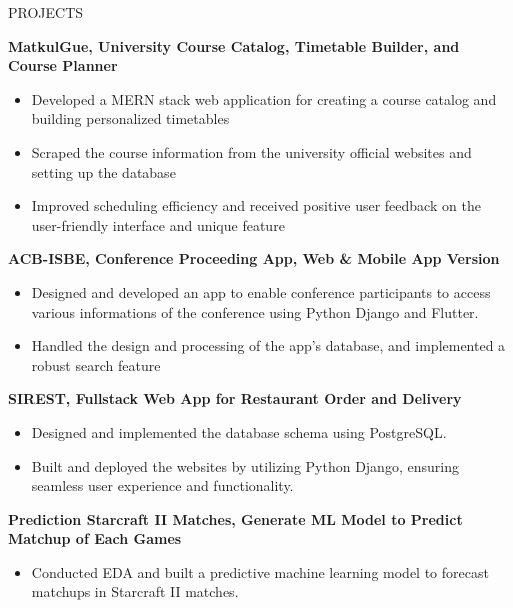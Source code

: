 \documentclass{resume} %
\begin{document}

\begin{rSection}{PROJECTS}

{\bf MatkulGue, University Course Catalog, Timetable Builder, and Course Planner}
\vspace{-0.75em}
\begin{itemize}
\itemsep -7pt {}
\item Developed a MERN stack web application for creating a course catalog and building personalized timetables
\item Scraped the course information from the university official websites and setting up the database
\item Improved scheduling efficiency and received positive user feedback on the user-friendly interface and unique feature
 \end{itemize}
 \vspace{-0.5em}

{\bf ACB-ISBE, Conference Proceeding App, Web \& Mobile App Version}
\vspace{-0.75em}
\begin{itemize}
\itemsep -7pt {}
\item Designed and developed an app to enable conference participants to access various informations of the conference using Python Django and Flutter.
\item Handled the design and processing of the app's database, and implemented a robust search feature
 \end{itemize}
 \vspace{-0.5em}

{\bf SIREST, Fullstack Web App for Restaurant Order and Delivery}
\vspace{-0.75em}
\begin{itemize}
\itemsep -7pt {}
\item Designed and implemented the database schema using PostgreSQL.
\item Built and deployed the websites by utilizing Python Django, ensuring seamless user experience and functionality.
 \end{itemize}
 \vspace{-0.5em}

{\bf Prediction Starcraft II Matches, Generate ML Model to Predict Matchup of Each Games}
\vspace{-0.75em}
\begin{itemize}
\itemsep -7pt {}
\item Conducted EDA and built a predictive machine learning model to forecast matchups in Starcraft II matches.
 \end{itemize}
 \vspace{-0.5em}


\end{rSection}
\end{document}
